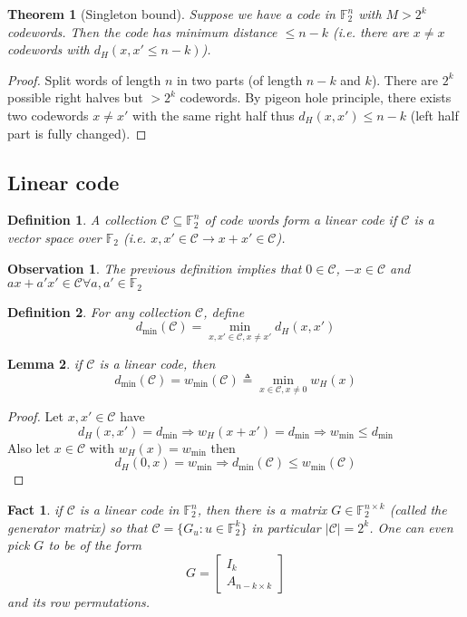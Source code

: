 \documentclass[twoside]{article}
\newtheorem{theorem}{Theorem}[section]
\newtheorem{fact}{Fact}[section]
\newtheorem{observation}{Observation}[section]
\newtheorem{lemma}[theorem]{Lemma}
\newtheorem{definition}{Definition}[section]
\theoremstyle{definition} %
\def\F{\mathbb{F}}
\def\C{\mathcal{C}}
\begin{document}
\begin{theorem}[Singleton bound]
  Suppose we have a code in $\F_2^n$ with $M > 2^k$ codewords. Then the code has minimum distance $\leq n - k$ (i.e. there are $x\not = x$ codewords with $d_H(x,x' \leq n-k)$).
\end{theorem}

\begin{proof}
  Split words of length $n$ in two parts (of length $n-k$ and $k$). There are $2^k$ possible right halves but $> 2^k$ codewords. By pigeon hole principle, there exists two codewords $x\not = x'$ with the same right half thus $d_H(x,x') \leq n-k$ (left half part is fully changed).
\end{proof}


\subsection{Linear code}

\begin{definition}
  A collection $\C \subseteq \F_2^n$ of code words form a linear code if $\C$ is a vector space over $\F_2$ (i.e. $x,x' \in \C \to x+x' \in \C$).
\end{definition}

\begin{observation}
  The previous definition implies that $0 \in \C$, $-x \in \C$ and $ax +a'x' \in \C \forall a,a' \in \F_2$
\end{observation}

\begin{definition}
  For any collection $\C$, define
  \[
    d_{\min}(\C) = \min_{x,x'\in \C, x\not=x'} d_H(x,x')
  \]
\end{definition}

\begin{lemma}
  if $\C$ is a linear code, then
  \[
    d_{\min}(\C) = w_{\min}(\C) \triangleq \min_{x\in \C, x \not=0} w_H(x)
  \]
\end{lemma}

\begin{proof}
  Let $x, x'\in \C$ have
  \[
    d_H(x,x') = d_{\min} \Rightarrow w_H(x+x') = d_{\min} \Rightarrow w_{\min} \leq d_{\min}
  \]
  Also let $x\in \C$ with $w_H(x) = w_{\min}$ then
  \[
    d_H(0,x) = w_{\min} \Rightarrow d_{\min}(\C) \leq w_{\min}(\C)
  \]
\end{proof}


\begin{fact}
  if $\C$ is a linear code in $\F_2^n$, then there is a matrix $G\in \F_2^{n\times k}$ (called the generator matrix) so that $\C = \{G_u : u \in \F_2^k \}$ in particular $|\C| = 2^k$. One can even pick $G$ to be of the form
  \[
    G=\begin{bmatrix}
      I_k\\
      A_{n-k\times k}
    \end{bmatrix}
  \]
  and its row permutations.
\end{fact}
\end{document}
